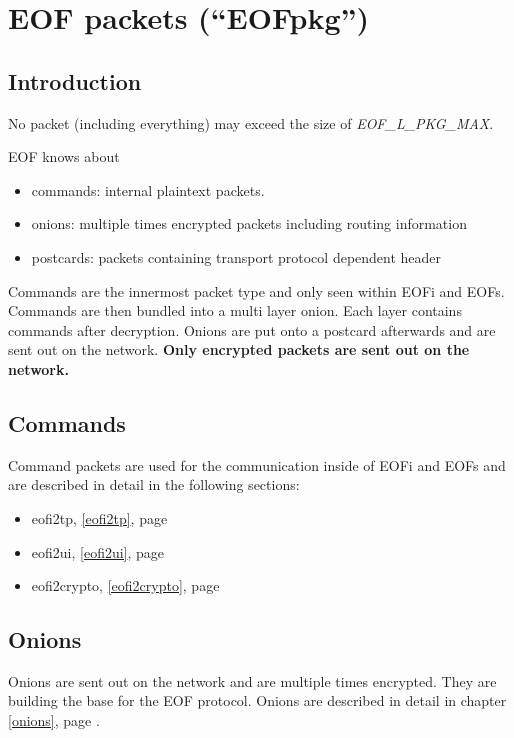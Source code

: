 \documentclass[12pt,a4paper]{book}
\begin{document}
\section{EOF packets ("`EOFpkg"')}
\label{eofpkg}
\subsection{Introduction}
No packet (including everything) may exceed the size of \emph{EOF\_L\_PKG\_MAX}.

EOF knows about
\begin{itemize}
\item commands: internal plaintext packets.
\item onions: multiple times encrypted packets including routing information
\item postcards: packets containing transport protocol dependent header
\end{itemize}
Commands are the innermost packet type and only seen within EOFi and EOFs.
Commands are then bundled into a multi layer onion. Each layer contains
commands after decryption.
Onions are put onto a postcard afterwards and are sent out on the network.
\textbf{Only encrypted packets are sent out on the network.}
\subsection{Commands}
Command packets are used for the communication inside of EOFi and EOFs and
are described in detail in the following sections:
\begin{itemize}
\item eofi2tp, \ref{eofi2tp}, page \pageref{eofi2tp}
\item eofi2ui, \ref{eofi2ui}, page \pageref{eofi2ui}
\item eofi2crypto, \ref{eofi2crypto}, page \pageref{eofi2crypto}
\end{itemize}
\subsection{Onions}
Onions are sent out on the network and are multiple times encrypted.
They are building the base for the EOF protocol.
Onions are described in detail in chapter \ref{onions}, page \pageref{onions}.
\end{document}
